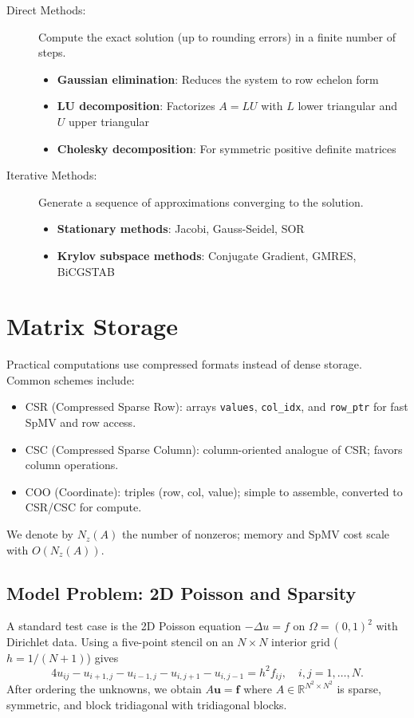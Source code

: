 \begin{description}
    \item[Direct Methods:] Compute the exact solution (up to rounding errors) in a finite number of steps.
          \begin{itemize}
              \item \textbf{Gaussian elimination}: Reduces the system to row echelon form
              \item \textbf{LU decomposition}: Factorizes $A = LU$ with $L$ lower triangular and $U$ upper triangular
              \item \textbf{Cholesky decomposition}: For symmetric positive definite matrices
          \end{itemize}

    \item[Iterative Methods:] Generate a sequence of approximations converging to the solution.
          \begin{itemize}
              \item \textbf{Stationary methods}: Jacobi, Gauss-Seidel, SOR
              \item \textbf{Krylov subspace methods}: Conjugate Gradient, GMRES, BiCGSTAB
          \end{itemize}
\end{description}

\section{Matrix Storage}
Practical computations use compressed formats instead of dense storage. Common schemes include:
\begin{itemize}
    \item CSR (Compressed Sparse Row): arrays \texttt{values}, \texttt{col\_idx}, and \texttt{row\_ptr} for fast SpMV and row access.
    \item CSC (Compressed Sparse Column): column-oriented analogue of CSR; favors column operations.
    \item COO (Coordinate): triples (row, col, value); simple to assemble, converted to CSR/CSC for compute.
\end{itemize}
We denote by $N_z(A)$ the number of nonzeros; memory and SpMV cost scale with $O(N_z(A))$.


\subsection{Model Problem: 2D Poisson and Sparsity}
A standard test case is the 2D Poisson equation $-\Delta u=f$ on $\Omega=(0,1)^2$ with Dirichlet data. Using a five-point stencil on an $N\times N$ interior grid ($h=1/(N+1)$) gives
\[
    4u_{ij} - u_{i+1,j} - u_{i-1,j} - u_{i,j+1} - u_{i,j-1} = h^2 f_{ij},\quad i,j=1,\dots,N.
\]
After ordering the unknowns, we obtain $A\mathbf{u}=\mathbf{f}$ where $A\in\mathbb{R}^{N^2\times N^2}$ is sparse, symmetric, and block tridiagonal with tridiagonal blocks.

